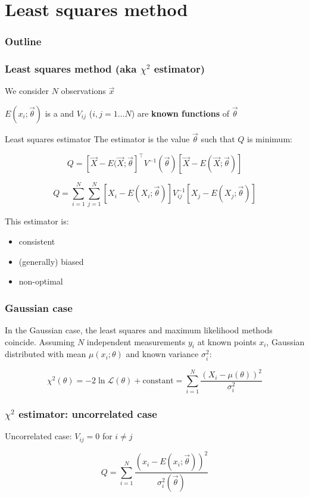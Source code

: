 \documentclass[9pt]{beamer}
\begin{document}
\section{Least squares method}

\begin{frame}
 \frametitle{Outline}
 
 \tableofcontents[current]
\end{frame}

\begin{frame}
 \frametitle{Least squares method (aka $\chi^2$ estimator)}
 
 We consider $N$ observations $\vec{x}$
 
 $E(x_i;\vec{\theta})$ is a  and $V_{ij}$ ($i,j = 1\dots N$) are \textbf{known functions} of $\vec{\theta}$
 
 \begin{block}{Least squares estimator}
 The estimator is the value $\vec{\theta}$ such that $Q$ is minimum:
 
  $$Q = \left[ \vec{X} - E(\vec{X};\vec{\theta}\right]^\intercal V^{-1} (\vec{\theta}) \left[ \vec{X} - E(\vec{X};\vec{\theta}) \right]$$
  
  $$Q = \sum_{i=1}^N \sum_{j=1}^N \left[ X_i - E(X_i;\vec{\theta})\right] V^{-1}_{ij} \left[ X_j - E(X_j;\vec{\theta})\right]$$
 \end{block}
 
 This estimator is:
 
 \begin{itemize}
  \item consistent
  \item (generally) biased
  \item non-optimal
 \end{itemize}


\end{frame}

\begin{frame}
 \frametitle{Gaussian case}
 
 In the Gaussian case, the least squares and maximum likelihood methods coincide. Assuming $N$ independent measurements $y_i$ at known points $x_i$, Gaussian distributed with mean
 $\mu(x_i;\theta)$ and known variance $\sigma_i^2$:
 
 $$\chi^2(\theta) = -2\ln\mathcal{L}(\theta) + \text{constant} = \sum_{i=1}^N \frac{\left(X_i - \mu(\theta)\right)^2}{\sigma_i^2}$$
\end{frame}


\begin{frame}
 \frametitle{$\chi^2$ estimator: uncorrelated case}
 
 Uncorrelated case: $V_{ij} = 0 $ for $i \neq j$
 
 $$Q = \sum_{i=1}^N \frac{\left(x_i - E(x_i; \vec{\theta})\right)^2}{\sigma_i^2(\vec{\theta})}$$
\end{frame}
\end{document}
